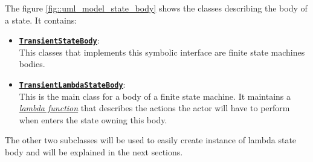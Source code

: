 The figure \ref{fig::uml_model_state_body} shows the classes describing the body of a state. It contains:
\begin{itemize}
	\item 	\href{https://github.com/LM-96/QA-Extensions/blob/main/it.unibo.qakactor/src/main/kotlin/model/actorbody/TransientStateBody.kt}{\underline{\textbf{\texttt{TransientStateBody}}}}:\\
	This classes that implements this symbolic interface are finite state machines bodies.
	
	\item 	\href{https://github.com/LM-96/QA-Extensions/blob/main/it.unibo.qakactor/src/main/kotlin/model/actorbody/TransientLambdaStateBody.kt}{\underline{\textbf{\texttt{TransientLambdaStateBody}}}}:\\
	This is the main class for a body of a finite state machine. It maintains a \href{https://kotlinlang.org/docs/lambdas.html}{\textit{lambda function}} that describes the actions the actor will have to perform when enters the state owning this body.
\end{itemize}
The other two subclasses will be used to easily create instance of lambda state body and will be explained in the next sections.




